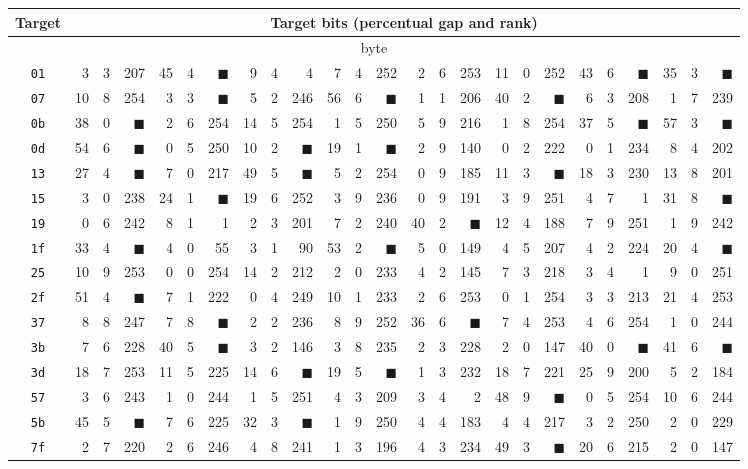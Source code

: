 \begin{tabular}{| c | r@{.} l@{\quad}r | r@{.} l@{\quad}r | r@{.} l@{\quad}r | r@{.} l@{\quad}r | r@{.} l@{\quad}r | r@{.} l@{\quad}r | r@{.} l@{\quad}r | r@{.} l@{\quad}r |}
	\hline
	Target & \multicolumn{24}{c|}{Target bits (percentual gap and rank)} \\
	\hline
	\hline
	\multicolumn{25}{|c|}{\nth{1} byte} \\
	\hline
	{\tt 01}&3&3&207&45&4&{$\blacksquare$}&9&4&4&7&4&252&2&6&253&11&0&252&43&6&{$\blacksquare$}&35&3&{$\blacksquare$}\\
	\hline
	{\tt 07}&10&8&254&3&3&{\weak$\blacksquare$}&5&2&246&56&6&{$\blacksquare$}&1&1&206&40&2&{$\blacksquare$}&6&3&208&1&7&239\\
	\hline
	{\tt 0b}&38&0&{$\blacksquare$}&2&6&254&14&5&254&1&5&250&5&9&216&1&8&254&37&5&{$\blacksquare$}&57&3&{$\blacksquare$}\\
	\hline
	{\tt 0d}&54&6&{$\blacksquare$}&0&5&250&10&2&{$\blacksquare$}&19&1&{$\blacksquare$}&2&9&140&0&2&222&0&1&234&8&4&202\\
	\hline
	{\tt 13}&27&4&{$\blacksquare$}&7&0&217&49&5&{$\blacksquare$}&5&2&254&0&9&185&11&3&{$\blacksquare$}&18&3&230&13&8&201\\
	\hline
	{\tt 15}&3&0&238&24&1&{$\blacksquare$}&19&6&252&3&9&236&0&9&191&3&9&251&4&7&1&31&8&{$\blacksquare$}\\
	\hline
	{\tt 19}&0&6&242&8&1&1&2&3&201&7&2&240&40&2&{$\blacksquare$}&12&4&188&7&9&251&1&9&242\\
	\hline
	{\tt 1f}&33&4&{$\blacksquare$}&4&0&55&3&1&90&53&2&{$\blacksquare$}&5&0&149&4&5&207&4&2&224&20&4&{$\blacksquare$}\\
	\hline
	{\tt 25}&10&9&253&0&0&254&14&2&212&2&0&233&4&2&145&7&3&218&3&4&1&9&0&251\\
	\hline
	{\tt 2f}&51&4&{$\blacksquare$}&7&1&222&0&4&249&10&1&233&2&6&253&0&1&254&3&3&213&21&4&253\\
	\hline
	{\tt 37}&8&8&247&7&8&{\weak$\blacksquare$}&2&2&236&8&9&252&36&6&{$\blacksquare$}&7&4&253&4&6&254&1&0&244\\
	\hline
	{\tt 3b}&7&6&228&40&5&{$\blacksquare$}&3&2&146&3&8&235&2&3&228&2&0&147&40&0&{$\blacksquare$}&41&6&{$\blacksquare$}\\
	\hline
	{\tt 3d}&18&7&253&11&5&225&14&6&{$\blacksquare$}&19&5&{$\blacksquare$}&1&3&232&18&7&221&25&9&200&5&2&184\\
	\hline
	{\tt 57}&3&6&243&1&0&244&1&5&251&4&3&209&3&4&2&48&9&{$\blacksquare$}&0&5&254&10&6&244\\
	\hline
	{\tt 5b}&45&5&{$\blacksquare$}&7&6&225&32&3&{$\blacksquare$}&1&9&250&4&4&183&4&4&217&3&2&250&2&0&229\\
	\hline
	{\tt 7f}&2&7&220&2&6&246&4&8&241&1&3&196&4&3&234&49&3&{$\blacksquare$}&20&6&215&2&0&147\\
	\hline
\end{tabular}
